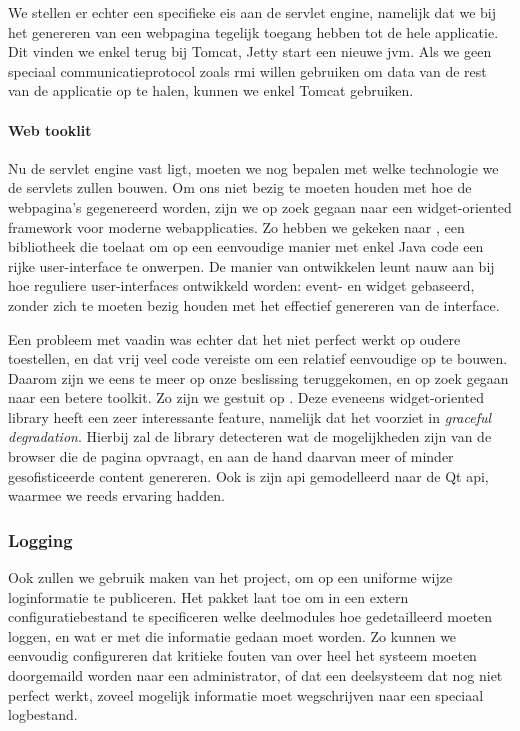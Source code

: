 We stellen er echter een specifieke eis aan de servlet engine, namelijk dat we bij het genereren van een webpagina tegelijk toegang hebben tot de hele applicatie. Dit vinden we enkel terug bij Tomcat, Jetty start een nieuwe \ac{jvm}. Als we geen speciaal communicatieprotocol zoals \ac{rmi} willen gebruiken om data van de rest van de applicatie op te halen, kunnen we enkel Tomcat gebruiken.

\paragraph{Web tooklit} Nu de servlet engine vast ligt, moeten we nog bepalen met welke technologie we de servlets zullen bouwen. Om ons niet bezig te moeten houden met hoe de webpagina's gegenereerd worden, zijn we op zoek gegaan naar een widget-oriented framework voor moderne webapplicaties. Zo hebben we gekeken naar , een bibliotheek die toelaat om op een eenvoudige manier met enkel Java code een rijke user-interface te onwerpen. De manier van ontwikkelen leunt nauw aan bij hoe reguliere user-interfaces ontwikkeld worden: event- en widget gebaseerd, zonder zich te moeten bezig houden met het effectief genereren van de interface.

Een probleem met vaadin was echter dat het niet perfect werkt op oudere toestellen, en dat vrij veel code vereiste om een relatief eenvoudige  op te bouwen. Daarom zijn we eens te meer op onze beslissing teruggekomen, en op zoek gegaan naar een betere toolkit. Zo zijn we gestuit op . Deze eveneens widget-oriented library heeft een zeer interessante feature, namelijk dat het voorziet in \emph{graceful degradation}. Hierbij zal de library detecteren wat de mogelijkheden zijn van de browser die de pagina opvraagt, en aan de hand daarvan meer of minder gesofisticeerde content genereren. Ook is zijn \ac{api} gemodelleerd naar de Qt \ac{api}, waarmee we reeds ervaring hadden. 

\subsubsection{Logging}

Ook zullen we gebruik maken van het  project, om op een uniforme wijze loginformatie te publiceren. Het pakket laat toe om in een extern configuratiebestand te specificeren welke deelmodules hoe gedetailleerd moeten loggen, en wat er met die informatie gedaan moet worden. Zo kunnen we eenvoudig configureren dat kritieke fouten van over heel het systeem moeten doorgemaild worden naar een administrator, of dat een deelsysteem dat nog niet perfect werkt, zoveel mogelijk informatie moet wegschrijven naar een speciaal logbestand.

